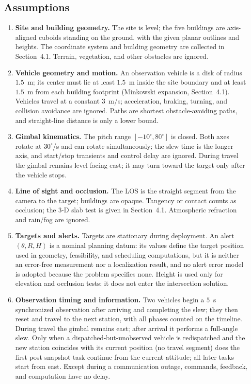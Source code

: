 \subsection{Assumptions}

\begin{enumerate}[label=(A\arabic*)]
\item \textbf{Site and building geometry.} The site is level; the five buildings are axis-aligned cuboids standing on the ground, with the given planar outlines and heights. The coordinate system and building geometry are collected in Section~4.1. Terrain, vegetation, and other obstacles are ignored.

\item \textbf{Vehicle geometry and motion.} An observation vehicle is a disk of radius $1.5$~m; its center must lie at least $1.5$~m inside the site boundary and at least $1.5$~m from each building footprint (Minkowski expansion, Section~4.1). Vehicles travel at a constant $3$~m/s; acceleration, braking, turning, and collision avoidance are ignored. Paths are shortest obstacle-avoiding paths, and straight-line distance is only a lower bound.

\item \textbf{Gimbal kinematics.} The pitch range $[-10^\circ,80^\circ]$ is closed. Both axes rotate at $30^\circ$/s and can rotate simultaneously; the slew time is the longer axis, and start/stop transients and control delay are ignored. During travel the gimbal remains level facing east; it may turn toward the target only after the vehicle stops.

\item \textbf{Line of sight and occlusion.} The LOS is the straight segment from the camera to the target; buildings are opaque. Tangency or contact counts as occlusion; the 3-D slab test is given in Section~4.1. Atmospheric refraction and rain/fog are ignored.

\item \textbf{Targets and alerts.} Targets are stationary during deployment. An alert $(\theta,R,H)$ is a nominal planning datum: its values define the target position used in geometry, feasibility, and scheduling computations, but it is neither an error-free measurement nor a localization result, and no alert error model is adopted because the problem specifies none. Height is used only for elevation and occlusion tests; it does not enter the intersection solution.

\item \textbf{Observation timing and information.} Two vehicles begin a $5$~s synchronized observation after arriving and completing the slew; they then reset and travel to the next station, with all phases counted on the timeline. During travel the gimbal remains east; after arrival it performs a full-angle slew. Only when a dispatched-but-unobserved vehicle is redispatched and the new station coincides with its current position (no travel segment) does the first post-snapshot task continue from the current attitude; all later tasks start from east. Except during a communication outage, commands, feedback, and computation have no delay.


\end{enumerate}

